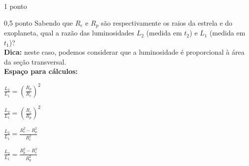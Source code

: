 \documentclass{../lista}
\begin{document}
\begin{questao}{1 ponto}
		\begin{pergunta}{0,5 ponto}
			Sabendo que $R_e$ e $R_p$ são respectivamente os raios da estrela e do exoplaneta, qual a razão das luminosidades $L_2$ (medida em $t_2$) e $L_1$ (medida em $t_1$)? \\
			\textbf{Dica:} neste caso, podemos considerar que a luminosidade é proporcional à área da seção transversal. \\

			\textbf{Espaço para cálculos:}
			\espacoCalculo

			\begin{multicols}{2} \begin{alternativas}
				\item $\frac{L_2}{L_1} = \left( \frac{R_p}{R_e} \right)^2$
				\item $\frac{L_2}{L_1} = \left( \frac{R_e}{R_p} \right)^2 $
				\item $\frac{L_2}{L_1} = \frac{R_e^2-R_p^2}{R_e^2}$
				\item $\frac{L_2}{L_1} = \frac{R_p^2-R_e^2}{R_p^2}$
			\end{alternativas} \end{multicols}
		\end{pergunta}
	\end{questao}
	
	\encerramento
\end{document}
